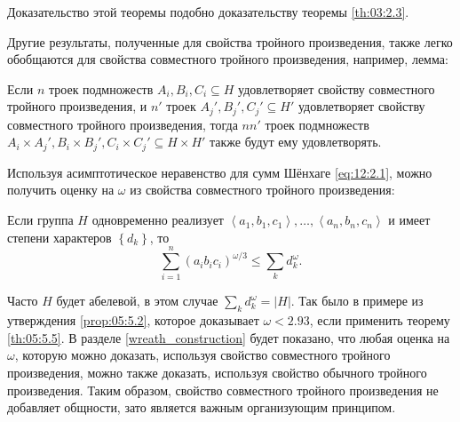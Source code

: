 Доказательство этой теоремы подобно доказательству теоремы \ref{th:03:2.3}.

Другие результаты, полученные для свойства тройного произведения, также легко обобщаются для свойства совместного тройного произведения, например, лемма:
\begin{lemma}
  \label{lem:05:5.4} Если $n$ троек подмножеств $A_i, B_i, C_i \subseteq H$ удовлетворяет свойству совместного тройного произведения, и $n'$ троек $A_j', B_j', C_j' \subseteq H'$ удовлетворяет свойству совместного тройного произведения, тогда $n n'$ троек подмножеств $A_i \times A_j', B_i \times B_j', C_i \times C_j' \subseteq H \times H'$ также будут ему удовлетворять.
\end{lemma}

Используя асимптотическое неравенство для сумм Шёнхаге \eqref{eq:12:2.1}, можно получить оценку на $\omega$ из свойства совместного тройного произведения:
\begin{theorem}
  \label{th:05:5.5} Если группа $H$ одновременно реализует $\left\langle a_1,b_1,c_1 \right\rangle, \dotsc, \left\langle a_n,b_n,c_n \right\rangle$ и имеет степени характеров $\left\{ d_k \right\}$, то
  \[
  	\sum_{i=1}^n (a_i b_i c_i)^{\omega/3} \leq \sum_k d_k^\omega.
  \]
\end{theorem}

Часто $H$ будет абелевой, в этом случае $\sum_k d_k^\omega=|H|$. Так было в примере из утверждения \ref{prop:05:5.2}, которое доказывает $\omega < 2.93$, если применить теорему \ref{th:05:5.5}. В разделе \ref{wreath_construction} будет показано, что любая оценка на $\omega$, которую можно доказать, используя свойство совместного тройного произведения, можно также доказать, используя свойство обычного тройного произведения. Таким образом, свойство совместного тройного произведения не добавляет общности, зато является важным организующим принципом.




























